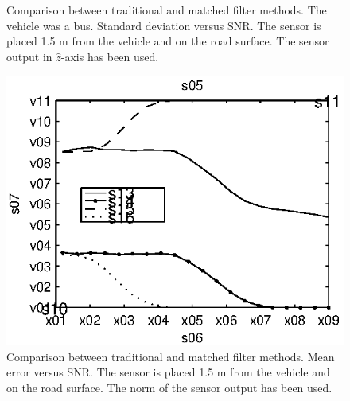 \begin{subfigures}
\begin{figure}[!tbhf]
\begin{minipage}{0.45\linewidth}
  \caption[Time difference, method comparison. Error standard deviation. $\hat{z}$-axis. (Bus)]{Comparison between traditional and matched filter methods. The vehicle was a bus. Standard deviation versus SNR. The sensor is placed 1.5 m from the vehicle and on the road surface. The sensor output in $\hat{z}$-axis has been used.}
  \label{fig:comp_std_z_bus}
  \end{minipage}
 \end{figure}
\end{subfigures}

\begin{subfigures}
\begin{figure}[!tbhf]
  \centering
  \begin{minipage}{0.45\linewidth}
  \centering
  
   \includegraphics[width=\linewidth]{images/mean_error_r}
  \caption[Time difference, method comparison. Mean error. Norm.]{Comparison between traditional and matched filter methods. Mean error versus SNR. The sensor is placed 1.5 m from the vehicle and on the road surface. The norm of the sensor output has been used.}
  \label{fig:comp_mean_r}
  \end{minipage}\hfill
  \begin{minipage}{0.45\linewidth}
   \centering
   

\end{minipage}
\end{figure}
\end{subfigures}
